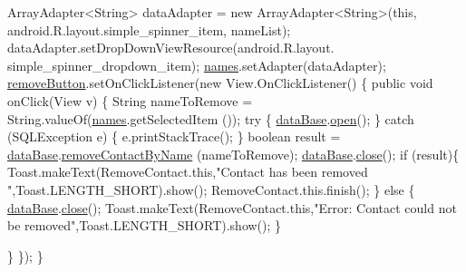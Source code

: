 \begin{DoxyCode}
        ArrayAdapter<String> dataAdapter = \textcolor{keyword}{new} ArrayAdapter<String>(\textcolor{keyword}{this}, 
      android.R.layout.simple\_spinner\_item, nameList);
        dataAdapter.setDropDownViewResource(android.R.layout.
      simple\_spinner\_dropdown\_item);
        \hyperlink{classnpi_1_1practicaandroid_1_1tutorialnpi_1_1_remove_contact_a3107d242c1dd4ee41c561a9d11b9b8fd}{names}.setAdapter(dataAdapter);
        \hyperlink{classnpi_1_1practicaandroid_1_1tutorialnpi_1_1_remove_contact_aa9dcb9cb24640807d67d9bb4db3a83f7}{removeButton}.setOnClickListener(\textcolor{keyword}{new} View.OnClickListener() 
      \{
            \textcolor{keyword}{public} \textcolor{keywordtype}{void} onClick(View v) \{
                String nameToRemove = String.valueOf(\hyperlink{classnpi_1_1practicaandroid_1_1tutorialnpi_1_1_remove_contact_a3107d242c1dd4ee41c561a9d11b9b8fd}{names}.getSelectedItem
      ());
                \textcolor{keywordflow}{try} \{
                    \hyperlink{classnpi_1_1practicaandroid_1_1tutorialnpi_1_1_remove_contact_a27f0a542a3a17b1fd5f4afd9fb7f93e4}{dataBase}.\hyperlink{classnpi_1_1practicaandroid_1_1tutorialnpi_1_1_adaptador_b_d_a128413ac90cfc708b95c21d946f9600d}{open}();
                \} \textcolor{keywordflow}{catch} (SQLException e) \{
                    e.printStackTrace();
                \}
                \textcolor{keywordtype}{boolean} result = \hyperlink{classnpi_1_1practicaandroid_1_1tutorialnpi_1_1_remove_contact_a27f0a542a3a17b1fd5f4afd9fb7f93e4}{dataBase}.\hyperlink{classnpi_1_1practicaandroid_1_1tutorialnpi_1_1_adaptador_b_d_a1fd702d46f017cca50e03a46eb0ff8dc}{removeContactByName}
      (nameToRemove);
                \hyperlink{classnpi_1_1practicaandroid_1_1tutorialnpi_1_1_remove_contact_a27f0a542a3a17b1fd5f4afd9fb7f93e4}{dataBase}.\hyperlink{classnpi_1_1practicaandroid_1_1tutorialnpi_1_1_adaptador_b_d_a466dc4c61ae61457cf986b5d8c6f6f52}{close}();
                \textcolor{keywordflow}{if} (result)\{
                    Toast.makeText(RemoveContact.this,\textcolor{stringliteral}{"Contact has been removed
      "},Toast.LENGTH\_SHORT).show();
                    RemoveContact.this.finish();
                \}
                \textcolor{keywordflow}{else} \{
                    \hyperlink{classnpi_1_1practicaandroid_1_1tutorialnpi_1_1_remove_contact_a27f0a542a3a17b1fd5f4afd9fb7f93e4}{dataBase}.\hyperlink{classnpi_1_1practicaandroid_1_1tutorialnpi_1_1_adaptador_b_d_a466dc4c61ae61457cf986b5d8c6f6f52}{close}();
                    Toast.makeText(RemoveContact.this,\textcolor{stringliteral}{"Error: Contact could not
       be removed"},Toast.LENGTH\_SHORT).show();
                \}
                
            \}
        \});
    \}
\end{DoxyCode}

